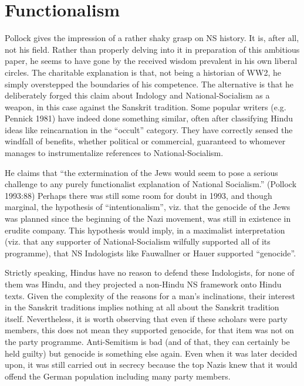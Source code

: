 \section*{Functionalism}

Pollock gives the impression of a rather shaky grasp on NS history. It is, after all, not his field. Rather than properly delving into it in preparation of this ambitious paper, he seems to have gone by the received wisdom prevalent in his own liberal circles. The charitable explanation is that, not being a historian of WW2, he simply overstepped the boundaries of his competence. The alternative is that he deliberately forged this claim about Indology and National-Socialism as a weapon, in this case against the Sanskrit tradition. Some popular writers (e.g. Pennick 1981) have indeed done something similar, often after classifying Hindu ideas like reincarnation in the “occult” category. They have correctly sensed the windfall of benefits, whether political or commercial, guaranteed to whomever manages to instrumentalize references to National-Socialism.

He claims that “the extermination of the Jews would seem to pose a serious challenge to any purely functionalist explanation of National Socialism.” (Pollock 1993:88) Perhaps there was still some room for doubt in 1993, and though marginal, the hypothesis of “intentionalism”, viz. that the genocide of the Jews was planned since the beginning of the Nazi movement, was still in existence in erudite company. This hypothesis would imply, in a maximalist interpretation (viz. that any supporter of National-Socialism wilfully supported all of its programme), that NS Indologists like Fauwallner or Hauer supported “genocide”.

Strictly speaking, Hindus have no reason to defend these Indologists, for none of them was Hindu, and they projected a non-Hindu NS framework onto Hindu texts. Given the complexity of the reasons for a man’s inclinations, their interest in the Sanskrit traditions implies nothing at all about the Sanskrit tradition itself. Nevertheless, it is worth observing that even if these scholars were party members, this does not mean they supported genocide, for that item was not on the party programme. Anti-Semitism is bad (and of that, they can certainly be held guilty) but genocide is something else again. Even when it was later decided upon, it was still carried out in secrecy because the top Nazis knew that it would offend the German population including many party members.

